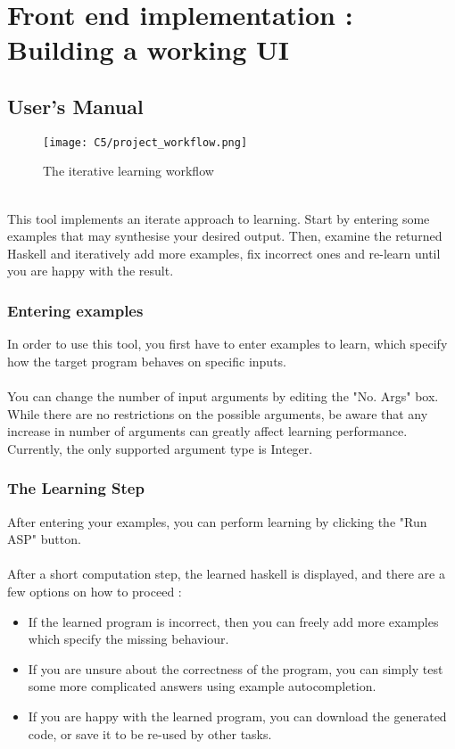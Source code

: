 \chapter{Front end implementation : Building a working UI}

\section{User's Manual}

\begin{figure}[h!]
\centering
\texttt{[image: C5/project\_workflow.png]}
\caption{The iterative learning workflow}
\end{figure}
\mbox{}\\
This tool implements an iterate approach to learning. Start by entering some examples that may synthesise your desired output. Then, examine the returned Haskell and iteratively add more examples, fix incorrect ones and re-learn until you are happy with the result.

\subsection{Entering examples}

In order to use this tool, you first have to enter examples to learn, which specify how the target program behaves on specific inputs.\\ \\
You can change the number of input arguments by editing the "No. Args" box. While there are no restrictions on the possible arguments, be aware that any increase in number of arguments can greatly affect learning performance. Currently, the only supported argument type is Integer. 

\subsection{The Learning Step}

After entering your examples, you can perform learning by clicking the "Run ASP" button. \\ \\
After a short computation step, the learned haskell is displayed, and there are a few options on how to proceed : 

\begin{itemize}
\item If the learned program is incorrect, then you can freely add more examples which specify the missing behaviour.
\item If you are unsure about the correctness of the program, you can simply test some more complicated answers using example autocompletion.
\item If you are happy with the learned program, you can download the generated code, or save it to be re-used by other tasks.
\end{itemize}  

